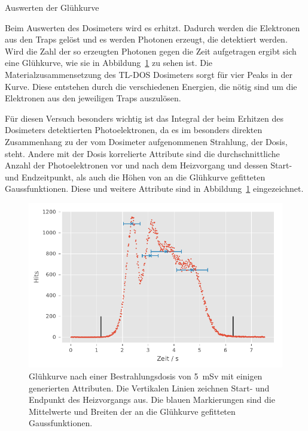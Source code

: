 \documentclass[20pt]{beamer}
\begin{document}
  \begin{columns}[t, onlytextwidth]%
    \begin{column}{0.666\textwidth}%
      \begin{block}{Auswerten der Glühkurve}%
              \begin{multicols}{2}
                  \begin{large}
                  Beim Auswerten des Dosimeters wird es erhitzt.
                  Dadurch werden die Elektronen aus den Traps gelöst und es werden Photonen erzeugt, die detektiert werden.
                  Wird die Zahl der so erzeugten Photonen gegen die Zeit aufgetragen ergibt sich eine Glühkurve, wie sie in Abbildung~\ref{pic:Glühkurve} zu sehen ist. 
                  Die Materialzusammensetzung des TL-DOS Dosimeters sorgt für vier Peaks in der Kurve. 
          Diese entstehen durch die verschiedenen Energien, die nötig sind um die Elektronen aus den jeweiligen Traps auszulösen. 
                  \end{large}

                  \begin{large}
Für diesen Versuch besonders wichtig ist das Integral der beim Erhitzen des Dosimeters detektierten Photoelektronen, da es im besonders direkten Zusammenhang zu der vom Dosimeter aufgenommenen Strahlung, der Dosis, steht.
Andere mit der Dosis korrelierte Attribute sind die durchschnittliche Anzahl der Photoelektronen vor und nach dem Heizvorgang und dessen Start- und Endzeitpunkt, als auch die Höhen von an die Glühkurve gefitteten Gaussfunktionen.
          Diese und weitere Attribute sind in Abbildung~\ref{pic:Glühkurve} eingezeichnet.
                  \end{large}
          \begin{figure}
              \includegraphics[width=\linewidth]{./python/attributeVisualization}
              \caption{Glühkurve nach einer Bestrahlungsdosis von \SI{5}{mSv} mit einigen generierten Attributen. Die Vertikalen Linien zeichnen Start- und Endpunkt des Heizvorgangs aus. Die blauen Markierungen sind die Mittelwerte und Breiten der an die Glühkurve gefitteten Gaussfunktionen.}
              \label{pic:Glühkurve}
          \end{figure}
          \columnbreak


\end{multicols}
\end{block}
\end{column}
\end{columns}
\end{document}

